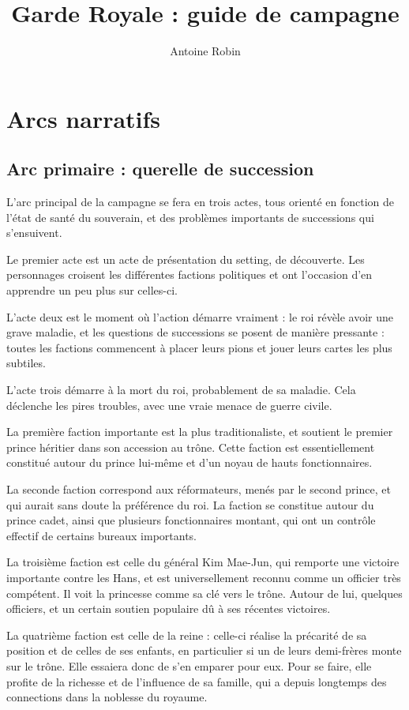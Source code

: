 \documentclass[10pt,a4paper]{book}
\author{ Antoine Robin}
\title{Garde Royale : guide de campagne}
\begin{document}
\maketitle
\tableofcontents
\chapter{Arcs narratifs}
\section{Arc primaire : querelle de succession}
L'arc principal de la campagne se fera en trois actes, tous orienté en fonction de l'état de santé du souverain, et des problèmes importants de successions qui s'ensuivent.

Le premier acte est un acte de présentation du setting, de découverte. Les personnages croisent les différentes factions politiques et ont l'occasion d'en apprendre un peu plus sur celles-ci.

L'acte deux est le moment où l'action démarre vraiment : le roi révèle avoir une grave maladie, et les questions de successions se posent de manière pressante : toutes les factions commencent à placer leurs pions et jouer leurs cartes les plus subtiles.

L'acte trois démarre à la mort du roi, probablement de sa maladie. Cela déclenche les pires troubles, avec une vraie menace de guerre civile.

La première faction importante est la plus traditionaliste, et soutient le premier prince héritier dans son accession au trône. Cette faction est essentiellement constitué autour du prince lui-même et d'un noyau de hauts fonctionnaires.

La seconde faction correspond aux réformateurs, menés par le second prince, et qui aurait sans doute la préférence du roi. La faction se constitue autour du prince cadet, ainsi que plusieurs fonctionnaires montant, qui ont un contrôle effectif de certains bureaux importants.

La troisième faction est celle du général Kim Mae-Jun, qui remporte une victoire importante contre les Hans, et est universellement reconnu comme un officier très compétent. Il voit la princesse comme sa clé vers le trône. Autour de lui, quelques officiers, et un certain soutien populaire dû à ses récentes victoires.

La quatrième faction est celle de la reine : celle-ci réalise la précarité de sa position et de celles de ses enfants, en particulier si un de leurs demi-frères monte sur le trône. Elle essaiera donc de s'en emparer pour eux. Pour se faire, elle profite de la richesse et de l'influence de sa famille, qui a depuis longtemps des connections dans la noblesse du royaume.
\end{document}
